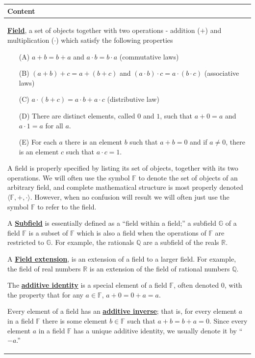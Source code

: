 \documentclass[11pt]{article}
\renewcommand\emph[1]{\underline{\bf{#1}}} %
\theoremstyle{definition}
\begin{document}
 \vspace*{-16pt}
\begin{tabular}{L{6.5in}} 
{\bf Content} \\ \hline \parskip4pt
\emph{Field}, a set of objects together with two operations - addition ($+$) and multiplication ($\cdot$) which satisfy the following properties
  \begin{enumerate}
    \item[(A)] $a+b=b+a$ and $a\cdot b=b\cdot a$ (commutative laws)
    \item[(B)] $(a+b)+c = a + (b+c)$ and $(a\cdot b)\cdot c = a\cdot (b \cdot c)$ (associative laws)
    \item[(C)] $a\cdot (b+c) = a\cdot b + a \cdot c$ (distributive law)
    \item[(D)] There are distinct elements, called $0$ and $1$, such that $a+0 = a $ and $a \cdot 1 = a$ for all $a$.
    \item[(E)] For each $a$ there is an element $b$ such that $a + b = 0$ and if $a\neq 0$, there is an element $c$ such that $a\cdot c = 1$.
  \end{enumerate}
  A field is properly specified by listing its set of objects, together with its two operations. We will often use the symbol $\mathbb{F}$ to 
  denote the set of objects of an arbitrary field, and complete mathematical structure is most properly denoted $\langle \mathbb{F},+,\cdot\rangle$.
  However, when no confusion will result we will often just use the symbol $\mathbb{F}$ to refer to the field.

  A \emph{Subfield} is essentially defined as a ``field within a field;'' a subfield $\mathbb{G}$ of a field $\mathbb{F}$ is a subset of $\mathbb{F}$ which is also
  a field when the operations of $\mathbb{F}$ are restricted to $\mathbb{G}$. For example, the rationals $\mathbb{Q}$ are a subfield of
  the reals $\mathbb{R}$.

  A \emph{Field extension}, is an extension of a field to a larger field. For example, the field of real numbers $\mathbb{R}$ is an extension of the field 
  of rational numbers $\mathbb{Q}$.

  The \emph{additive identity} is a special element of a field $\mathbb{F}$, often denoted $0$, with the property that for any $a\in\mathbb{F}$,
  $a+0=0+a=a$.

  Every element of a field has an \emph{additive inverse}; that is, for every element $a$ in a field $\mathbb{F}$ there is some element $b\in\mathbb{F}$
  such that $a+b=b+a = 0$. Since every element $a$ in a field $\mathbb{F}$ has a unique additive identity, we usually denote it by ``$-a$.''


\end{tabular}
\end{document}
